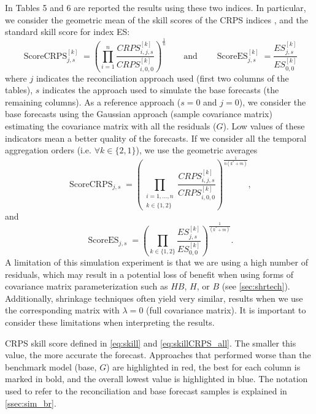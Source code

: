 \documentclass[a4paper,11pt]{article}
\theoremstyle{definition}
\begin{document}
In Tables 5 and 6 are reported the results using these two indices. In
particular, we consider the geometric mean of the skill scores of the
CRPS indices \citep{fleming1986}, and the standard skill score
for index ES:
\begin{equation}\label{eq:skill}
	\operatorname{ScoreCRPS}_{j,s}^{[k]} = \left(\prod_{i = 1}^n \frac{CRPS^{[k]}_{i, j, s}}{CRPS^{[k]}_{i, 0, 0}}\right)^{\frac{1}{n}} \qquad \mathrm{and} \qquad \operatorname{ScoreES}_{j,s}^{[k]} = \frac{ES^{[k]}_{j, s}}{ES^{[k]}_{0, 0}}
\end{equation}
where $j$ indicates the reconciliation approach used (first two columns of the tables), $s$ indicates the approach used to simulate the base forecasts (the remaining columns). As a reference approach ($s=0$ and $j=0$), we consider the base forecasts using the Gaussian approach (sample covariance matrix) estimating the covariance matrix with all the residuals ($G$). Low values of these indicators mean a better quality of the forecasts. If we consider all the temporal aggregation orders (i.e. $\forall k \in \{2,1\}$), we use the geometric averages
\begin{equation}\label{eq:skillCRPS_all}
	\operatorname{ScoreCRPS}_{j,s} = \left(\prod_{\substack{i = 1, \dots, n \\ k \in \{1,2\}}}\frac{CRPS^{[k]}_{i, j, s}}{CRPS^{[k]}_{i, 0, 0}}\right)^{\frac{1}{n(k^\ast+m)}},
\end{equation}
and
\begin{equation}\label{eq:skillES_all}
	\operatorname{ScoreES}_{j,s}= \left(\prod_{k \in \{1,2\}}\frac{ES^{[k]}_{j, s}}{ES^{[k]}_{0, 0}}\right)^{\frac{1}{(k^\ast+m)}}.
\end{equation}
A limitation of this simulation experiment is that we are using a high number of residuals, which may result in a potential loss of benefit when using forms of covariance matrix parameterization such as $HB$, $H$, or $B$ (see \autoref{sec:shrtech}). Additionally, shrinkage techniques often yield very similar, results when we use the corresponding matrix with $\lambda = 0$ (full covariance matrix). It is important to consider these limitations when interpreting the results.

\begin{table}[p]
	\centering
	\begingroup
	\fontsize{9}{11}\selectfont
	
	\endgroup
	\caption{CRPS skill score defined in \eqref{eq:skill} and \eqref{eq:skillCRPS_all}. The smaller this value, the more accurate the forecast. Approaches that performed worse than the benchmark model (base, $G$) are highlighted in red, the best for each column is marked in bold, and the overall lowest value is highlighted in blue. The notation used to refer to the reconciliation and base forecast samples is explained in \autoref{ssec:sim_br}.}
	\label{tab:ar2crps}
\end{table}
\end{document}
